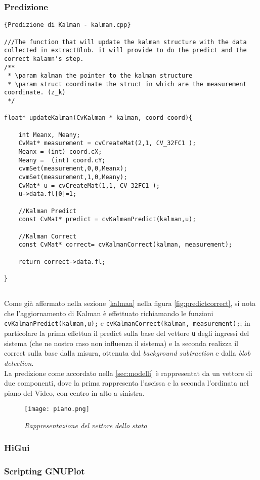\subsubsection{Predizione}

\lstset{language=c++}
\lstset{commentstyle=\emph}
\begin{lstlisting}[frame=r,caption=Predizione di Kalman - kalman.cpp ,breaklines=true,basicstyle=\small]{Predizione di Kalman - kalman.cpp}

///The function that will update the kalman structure with the data collected in extractBlob. it will provide to do the predict and the correct kalamn's step.
/**
 * \param kalman the pointer to the kalman structure
 * \param struct coordinate the struct in which are the measurement coordinate. (z_k)
 */

float* updateKalman(CvKalman * kalman, coord coord){
	
	int Meanx, Meany;
	CvMat* measurement = cvCreateMat(2,1, CV_32FC1 );
	Meanx = (int) coord.cX;
	Meany =  (int) coord.cY;
	cvmSet(measurement,0,0,Meanx);
	cvmSet(measurement,1,0,Meany);
	CvMat* u = cvCreateMat(1,1, CV_32FC1 );
	u->data.fl[0]=1;
	
	//Kalman Predict
	const CvMat* predict = cvKalmanPredict(kalman,u);

	//Kalman Correct
	const CvMat* correct= cvKalmanCorrect(kalman, measurement);
	
	return correct->data.fl;

}


\end{lstlisting}

Come già affermato nella sezione \ref{kalman} nella figura \ref{fig:predictcorrect}, si nota che l'aggiornamento di Kalman è effettuato richiamando le funzioni \texttt{cvKalmanPredict(kalman,u);} e  \texttt{cvKalmanCorrect(kalman, measurement);}; in particolare la prima effettua il predict sulla base del vettore \texttt{u} degli ingressi del sistema (che ne nostro caso non influenza il sistema) e la seconda realizza il correct sulla base dalla misura, ottenuta dal \textit{background subtraction} e dalla \textit{blob detection}. \\
La predizione come accordato nella \ref{sec:modelli} è rappresentat da un vettore di due componenti, dove la prima rappresenta l'ascissa e la seconda l'ordinata nel piano del Video, con centro in alto a sinistra.

\begin{figure}[hbp]
\centering
	\texttt{[image: piano.png]}
\caption[Rappresentazione del vettore dello stato]{\textit{Rappresentazione del vettore dello stato}\label{fig:pianoStato}}
\end{figure}

\subsubsection{HiGui}

\subsubsection{Scripting GNUPlot}


